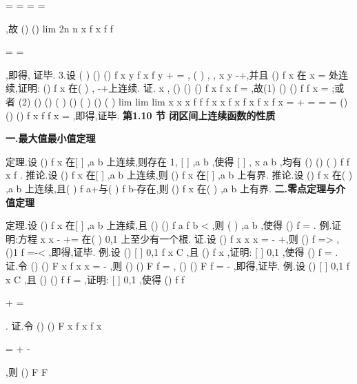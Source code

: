 =
=
=
=












\Lambda 
,故
()
()
lim
2n
n
x
f
x
f
f
\to \infty 


=
=




,即得, 
证毕. 
3.设
(
)
()
()
f x
y
f x f
y
+
=
,
(
)
,
,
x y
\forall 
\in -\infty +\infty ,并且
()
f x 在
x =
处连续,证明: 
()
f x 在(
)
,
-\infty +\infty 上连续. 
证.
x
\forall ,
()
()
()
f x
f x f
=
,故(1)
()
()
f
f x
=
\Rightarrow 
\equiv 
;或者 
(2)
()
()
(
)
()
(
)
()
(
)
lim
lim
lim
x
x
x
f
f
f x
x
f x f
x
f x
f
x
\Delta \to 
\Delta \to 
\Delta \to 
\neq 
\Rightarrow 
=\Rightarrow 
+\Delta 
=
\Delta 
=
\Delta 
= 
()
()
()
f x f
f x
=
,即得,证毕. 
\vspace{6pt}
{\large \bfseries \textcolor{lyred}{第1.10 节 闭区间上连续函数的性质}}

\vspace{4pt}
{\bfseries \textcolor{lyred}{一.最大值最小值定理}}

\textcolor{lyred}{定理}.设
()
f x 在[
]
,a b 上连续,则存在
1\psi ,
[
]
,a b
\psi \in 
,使得
[
]
,
x
a b
\forall \in 
,均有 
()
()
(
)
f
f x
f
\psi 
\psi 
\le 
\le 
. 
\textcolor{lyred}{推论}.设
()
f x 在[
]
,a b 上连续,则
()
f x 在[
]
,a b 上有界. 
\textcolor{lyred}{推论}.设
()
f x 在(
)
,a b 上连续,且(
)
f a+与(
)
f b-存在,则
()
f x 在(
)
,a b 上有界. 
\vspace{4pt}
{\bfseries \textcolor{lyred}{二.零点定理与介值定理}}

\textcolor{lyred}{定理}.设
()
f x 在[
]
,a b 上连续,且
()
()
f a
f b
\cdots 
<
,则
(
)
,a b
\psi 
\exists \in 
,使得
()
f \psi =
. 
\textcolor{lyred}{例}.证明:方程
x
x
-
+=
在(
)
0,1 上至少有一个根. 
证.设
()
f x
x
x
=
-
+,则
()
f
=>
,
()1
f
=-<
,即得,证毕. 
\textcolor{lyred}{例}.设
()
[
]
0,1
f x
C
\in 
,且
()
f x
\le 
\le ,证明:
[
]
0,1
\psi 
\exists \in 
,使得
()
f \psi 
\psi 
=
. 
证.令
()
()
F x
f x
x
=
-
,则
()
()
F
f
=
\ge 
,
()
()
F
f
=
-\le 
,即得,证毕. 
\textcolor{lyred}{例}.设
()
[
]
0,1
f x
C
\in 
,且
()
()
f
f
=
,证明:
[
]
0,1
\psi 
\exists \in 
,使得
()
f
f
\psi 
\psi 


+
=




. 
证.令
()
()
F x
f
x
f x


=
+
-




,则
()
F
F 

